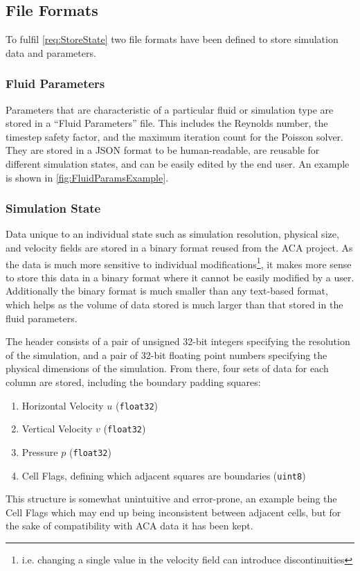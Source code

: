 \subsection{File Formats}\label{sec:FileFormat}
To fulfil \cref{req:StoreState} two file formats have been defined to store simulation data and parameters.

\subsubsection{Fluid Parameters}
Parameters that are characteristic of a particular fluid or simulation type are stored in a ``Fluid Parameters'' file.
This includes the Reynolds number, the timestep safety factor, and the maximum iteration count for the Poisson solver.
They are stored in a JSON format to be human-readable, are reusable for different simulation states, and can be easily edited by the end user.
An example is shown in \cref{fig:FluidParamsExample}.



\subsubsection{Simulation State}
Data unique to an individual state such as simulation resolution, physical size, and velocity fields are stored in a binary format reused from the ACA project.
As the data is much more sensitive to individual modifications\footnote{i.e. changing a single value in the velocity field can introduce discontinuities}, it makes more sense to store this data in a binary format where it cannot be easily modified by a user.
Additionally the binary format is much smaller than any text-based format, which helps as the volume of data stored is much larger than that stored in the fluid parameters.

The header consists of a pair of unsigned 32-bit integers specifying the resolution of the simulation, and a pair of 32-bit floating point numbers specifying the physical dimensions of the simulation.
From there, four sets of data for each column are stored, including the boundary padding squares:
\begin{enumerate}
    \item Horizontal Velocity $u$ (\texttt{float32})
    \item Vertical Velocity $v$ (\texttt{float32})
    \item Pressure $p$ (\texttt{float32})
    \item Cell Flags, defining which adjacent squares are boundaries (\texttt{uint8})
\end{enumerate}
This structure is somewhat unintuitive and error-prone, an example being the Cell Flags which may end up being inconsistent between adjacent cells, but for the sake of compatibility with ACA data it has been kept.
